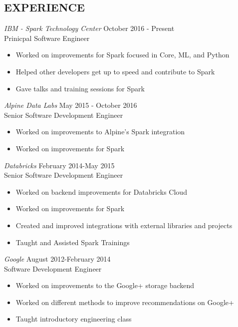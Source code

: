 \documentclass[10pt,line,margin=0.1]{newsres}
\begin{document}
\begin{resume}
\section{EXPERIENCE}
        {\sl IBM - Spark Technology Center} \hfill October 2016 - Present\\
        Prinicpal Software Engineer
        \begin{itemize}  \itemsep -2pt %
          \item Worked on improvements for Spark focused in Core, ML, and Python
          \item Helped other developers get up to speed and contribute to Spark
          \item Gave talks and training sessions for Spark
        \end{itemize}
        {\sl Alpine Data Labs} \hfill May 2015 - October 2016\\
        Senior Software Development Engineer
        \begin{itemize}  \itemsep -2pt %
          \item Worked on improvements to Alpine's Spark integration
          \item Worked on improvements for Spark
        \end{itemize}
      {\sl Databricks} \hfill February 2014-May 2015\\
        Senior Software Development Engineer
        \begin{itemize}  \itemsep -2pt %
          \item Worked on backend improvements for Databricks Cloud
          \item Worked on improvements for Spark
          \item Created and improved integrations with external libraries and projects
          \item Taught and Assisted Spark Trainings
        \end{itemize}
        {\sl Google} \hfill August 2012-February 2014\\
        Software Development Engineer
        \begin{itemize}  \itemsep -2pt %
          \item Worked on improvements to the Google+ storage backend
          \item Worked on different methods to improve recommendations on Google+
          \item Taught introductory engineering class

\end{itemize}
\end{resume}
\end{document}
